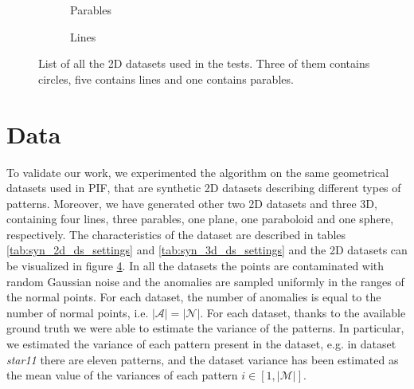 \begin{figure}[htb]
\begin{subfigure}{0.17\textwidth}
         \label{subfig:star11}
     \end{subfigure}
     \hfill
     \begin{subfigure}{0.17\textwidth}
         \centering
        
         \caption{Parables}
         \label{subfig:circles-parable3}
     \end{subfigure}
     \hfill
     \begin{subfigure}{0.17\textwidth}
         \centering
        
         \caption{Lines}
         \label{subfig:lines-rects4}
     \end{subfigure}
     \hfill
     \caption{List of all the 2D datasets used in the tests. Three of them contains circles, five contains lines and one contains parables.}
     \label{fig:all_datasets}
\end{figure}

\section{Data}
\hspace{5pt}
To validate our work, we experimented the algorithm on the same geometrical datasets used in PIF, that are synthetic 2D datasets describing different types of patterns. Moreover, we have generated other two 2D datasets and three 3D, containing four lines, three parables, one plane, one paraboloid and one sphere, respectively. \newline
The characteristics of the dataset are described in tables \ref{tab:syn_2d_ds_settings} and \ref{tab:syn_3d_ds_settings} and the 2D datasets can be visualized in figure \ref{fig:all_datasets}. \newline
In all the datasets the points are contaminated with random Gaussian noise and the anomalies are sampled uniformly in the ranges of the normal points. For each dataset, the number of anomalies is equal to the number of normal points, i.e. $|\mathcal{A}| = |\mathcal{N}|$. \newline
For each dataset, thanks to the available ground truth we were able to estimate the variance of the patterns. In particular, we estimated the variance of each pattern present in the dataset, e.g. in dataset \textit{star11} there are eleven patterns, and the dataset variance has been estimated as the mean value of the variances of each pattern $i \in [1, |\mathcal{M}|]$.

